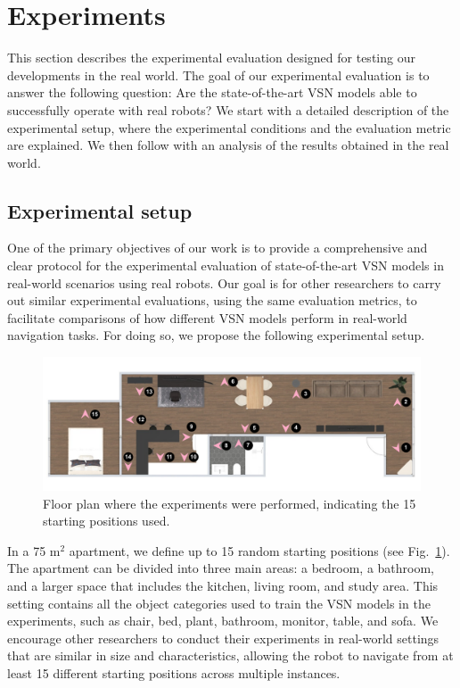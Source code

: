 \section{Experiments}\label{sec:experiments}
This section describes the experimental evaluation designed for testing our developments in the real world.
The goal of our experimental evaluation is to answer the following question: Are the state-of-the-art VSN models able to successfully operate with real robots?
We start with a detailed description of the experimental setup, where the experimental conditions and the evaluation metric are explained.
We then follow with an analysis of the results obtained in the real world.

\subsection{Experimental setup}
\label{subsec:experimental_setup}

One of the primary objectives of our work is to provide a comprehensive and clear protocol for the experimental evaluation of state-of-the-art VSN models in real-world scenarios using real robots.
Our goal is for other researchers to carry out similar experimental evaluations, using the same evaluation metrics, to facilitate comparisons of how different VSN models perform in real-world navigation tasks.
For doing so, we propose the following experimental setup.

\begin{figure}[t]
    \centering
        \includegraphics[width=\linewidth]{figures/ros4vsn/plano_vivienda}
        \caption{Floor plan where the experiments were performed, indicating the 15 starting positions used.}
        \label{fig:floor_plan}
\end{figure}

In a 75 m$^2$ apartment, we define up to 15 random starting positions (see Fig.~\ref{fig:floor_plan}).
The apartment can be divided into three main areas: a bedroom, a bathroom, and a larger space that includes the kitchen, living room, and study area.
This setting contains all the object categories used to train the VSN models in the experiments, such as chair, bed, plant, bathroom, monitor, table, and sofa.
We encourage other researchers to conduct their experiments in real-world settings that are similar in size and characteristics, allowing the robot to navigate from at least 15 different starting positions across multiple instances.

